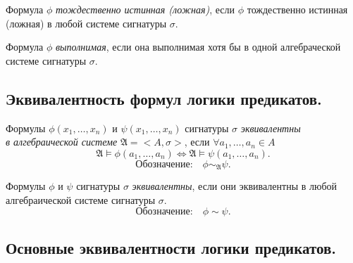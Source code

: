\begin{definition}
    Формула $ \phi $ \emph{тождественно истинная (ложная)}, если $ \phi $ тождественно истинная (ложная) в любой системе сигнатуры $ \sigma $.

    Формула $ \phi $ \emph{выполнимая}, если она выполнимая хотя бы в одной алгебраческой системе сигнатуры $ \sigma $.
\end{definition}

\newpage

\subsection{Эквивалентность формул логики предикатов.}

\begin{definition}
    Формулы $ \phi(x_1,\ldots,x_n) $ и $ \psi(x_1,\ldots,x_n) $ сигнатуры $ \sigma $ \emph{эквивалентны} \\ \emph{в алгебраической системе} $ \mathfrak{A} = <A,\sigma> $, если $ \forall a_1,\ldots,a_n \in A $
    \[
        \mathfrak{A} \vDash \phi(a_1,\ldots,a_n) \iff \mathfrak{A} \vDash \psi(a_1,\ldots,a_n).
    \]
    \[
        \text{Обозначение:} \quad \phi \sim_\mathfrak{A} \psi.
    \]
\end{definition}

\begin{definition}
    Формулы $ \phi $ и $ \psi $ сигнатуры $ \sigma $ \emph{эквивалентны}, если они эквивалентны в любой алгебраической системе сигнатуры $ \sigma $.
    \[
        \text{Обозначение:} \quad \phi \sim \psi.
    \]
\end{definition}

\subsection{Основные эквивалентности логики предикатов.}

